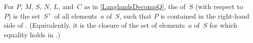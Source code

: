 \begin{defn} \label{PosWeylChamberDefn}
For $P$, $M$, $S$, $N$, $L$, and~$C$ as in \cref{LanglandsDecompQ}, the 
%
of~$S$ (with respect to~$P$) is the set~$S^+$ of all elements~$a$ of~$S$, such that $P$ is contained in the right-hand side of . (Equivalently, it is the closure of the set of elements~$a$ of~$S$ for which equality holds in .)
\end{defn}



